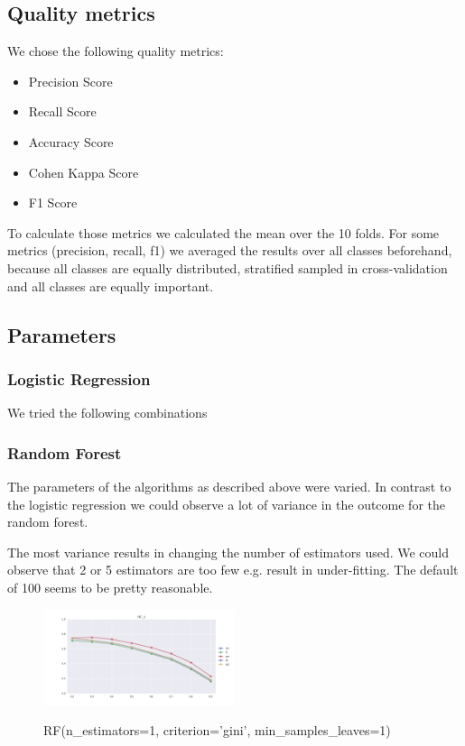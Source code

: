 \documentclass{sig-alternate-05-2015}
\begin{document}
\subsection{Quality metrics}

We chose the following quality metrics:
\begin{itemize}
	\item Precision Score
	\item Recall Score
	\item Accuracy Score
	\item Cohen Kappa Score
	\item F1 Score
\end{itemize}

To calculate those metrics we calculated the mean over the 10 folds.
For some metrics (precision, recall, f1) we averaged the results over all classes beforehand, because all classes are equally distributed, stratified sampled in cross-validation and all classes are equally important.

\subsection{Parameters}

\subsubsection{Logistic Regression}
We tried the following combinations

\subsubsection{Random Forest}
The parameters of the algorithms as described above were varied.
In contrast to the logistic regression we could observe a lot of variance in the outcome for the random forest.

The most variance results in changing the number of estimators used. We could observe that 2 or 5 estimators are too few e.g. result in under-fitting. The default of 100 seems to be pretty reasonable.

\begin{figure}[]
  \centering
  \caption{RF(n\_estimators=1, criterion='gini', min\_samples\_leaves=1)}
  \includegraphics[width=0.5\textwidth]{../plots/RF_1}
  \label{fig:anomalySetup}
\end{figure}
\end{document}
